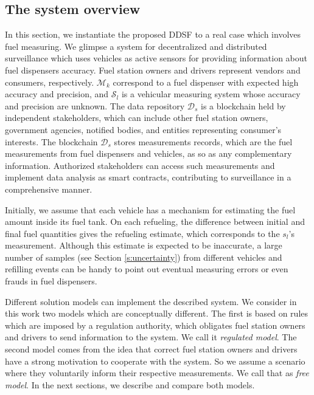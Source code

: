 \documentclass[sigplan]{acmart}
\begin{document}
\subsection{The system overview}
In this section, we instantiate the proposed DDSF to a real case which involves fuel measuring.
We glimpse a system for decentralized and distributed surveillance which uses vehicles as active sensors for providing information about fuel dispensers accuracy.
Fuel station owners and drivers represent vendors and consumers, respectively.
$\mathcal{M}_k$ correspond to a fuel dispenser with expected high accuracy and precision, and $\mathcal{S}_l$ is a vehicular measuring system whose accuracy and precision are unknown.
The data repository $\mathcal{D}_s$ is a blockchain held by independent stakeholders, which can include other fuel station owners, government agencies, notified bodies, and entities representing consumer's interests.
The blockchain $\mathcal{D}_s$ stores measurements records, which are the fuel measurements from fuel dispensers and vehicles, as so as any complementary information.
Authorized stakeholders can access such measurements and implement data analysis as smart contracts, contributing to surveillance in a comprehensive manner.

Initially, we assume that each vehicle has a mechanism for estimating the fuel amount inside its fuel tank.
On each refueling, the difference between initial and final fuel quantities gives the refueling estimate, which corresponds to the $s_l$'s measurement.
Although this estimate is expected to be inaccurate, a large number of samples (see Section \ref{s:uncertainty}) from different vehicles and refilling events can be handy to point out eventual measuring errors or even frauds in fuel dispensers.

Different solution models can implement the described system.
We consider in this work two models which are conceptually different.
The first is based on rules which are imposed by a regulation authority, which obligates fuel station owners and drivers to send information to the system. We call it \emph{regulated model}.
The second model comes from the idea that correct fuel station owners and drivers have a strong motivation to cooperate with the system.
So we assume a scenario where they voluntarily inform their respective measurements.
We call that as \emph{free model}.
In the next sections, we describe and compare both models.
\end{document}
